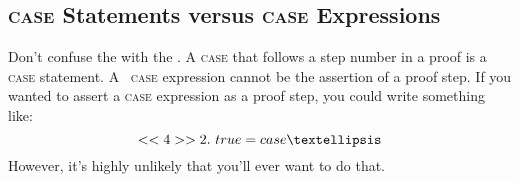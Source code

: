 \documentclass[fleqn,leqno]{article}
\begin{document}
 \vspace{-2\baselineskip}%
\subsection*{{\rm \textsc{case}} Statements versus 
    {\rm \textsc{case}} Expressions} 

Don't confuse the 
with the 
  .
A \textsc{case} that follows a step number in a proof is a
\textsc{case} statement.  A \tlaplus\ \textsc{case} expression cannot
be the assertion of a proof step.  If you wanted to assert
a \textsc{case} expression as a proof step, you could write
something like:
  \[ <<4>>2.\ \TRUE = \CASE \ldots
  \]
However, it's highly unlikely that you'll ever want to do that.
\end{document}
